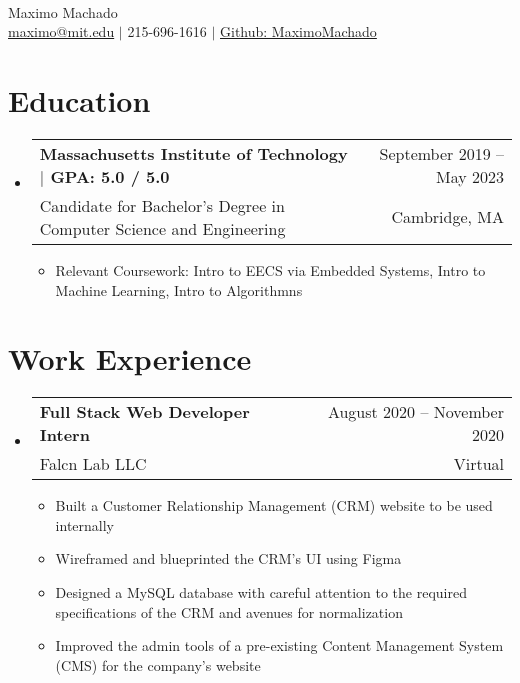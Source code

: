 \documentclass[letterpaper,12pt]{article} %
\makeatletter
\newcommand{\CVItem}[1]{
  \item\small{
    {#1 \vspace{-2pt}}
  }
}
\newcommand{\CVSubheading}[4]{
  \vspace{-2pt}\item
    \begin{tabular*}{0.97\textwidth}[t]{l@{\extracolsep{\fill}}r}
      \textbf{#1} & #2 \\
      \small#3 & \small #4 \\
    \end{tabular*}\vspace{-7pt}
}
\newcommand{\CVSubHeadingListStart}{\begin{itemize}[leftmargin=0.15in, label={}]} %
\newcommand{\CVSubHeadingListEnd}{\end{itemize}}
\newcommand{\CVItemListStart}{\begin{itemize}}
\newcommand{\CVItemListEnd}{\end{itemize}\vspace{-5pt}}
\makeatother
\begin{document}

\begin{minipage}[c]{0.05\textwidth}
  \-\
\end{minipage}

\begin{center}
  \Huge Maximo Machado \\ \vspace{1pt} %
  \small
  \href{mailto:maximo@mit.edu}{maximo@mit.edu} $|$
  215-696-1616 $|$
  \href{https://github.com/MaximoMachado}{Github: MaximoMachado}
\end{center}
\vspace{-17pt} %

\section{Education}
\CVSubHeadingListStart
\CVSubheading
{{Massachusetts Institute of Technology $|$ \small{GPA: 5.0 / 5.0}}}{September 2019 -- May 2023}
{Candidate for Bachelor's Degree in Computer Science and Engineering}{Cambridge, MA}

\CVItemListStart
\CVItem{Relevant Coursework:
  Intro to EECS via Embedded Systems,
  Intro to Machine Learning,
  Intro to Algorithmns}
\CVItemListEnd
\CVSubHeadingListEnd

\section{Work Experience}
\CVSubHeadingListStart
\CVSubheading
{Full Stack Web Developer Intern}{August 2020 -- November 2020}
{Falcn Lab LLC}{Virtual}
\CVItemListStart
\CVItem{Built a Customer Relationship Management (CRM) website to be used internally}
\CVItem{Wireframed and blueprinted the CRM's UI using Figma}
\CVItem{Designed a MySQL database with careful attention to the required specifications of the CRM and avenues for normalization}
\CVItem{Improved the admin tools of a pre-existing Content Management System (CMS) for the company's website}
\CVItemListEnd
\CVSubHeadingListEnd
\end{document}
